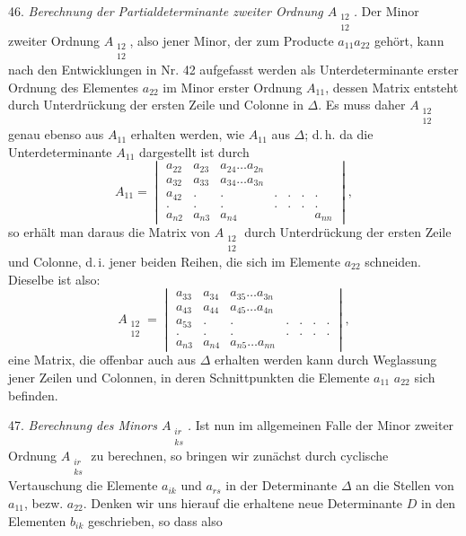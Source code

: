 \documentclass[11pt]{article}
\begin{document}
46. \textit{Berechnung der Partialdeterminante zweiter Ordnung $A_{\substack{12\\12}}$.} Der Minor zweiter Ordnung $A_{\substack{12\\12}}$, also jener Minor, der zum Producte $a_{11}a_{22}$ gehört, kann nach den Entwicklungen in Nr. 42 aufgefasst werden als Unterdeterminante erster Ordnung des Elementes $a_{22}$ im Minor erster Ordnung $A_{11}$, dessen Matrix entsteht durch Unterdrückung der ersten Zeile und Colonne in $\varDelta$. Es muss daher $A_{\substack{12\\12}}$ genau ebenso aus $A_{11}$ erhalten werden, wie $A_{11}$ aus $\varDelta$; d.\,h. da die Unterdeterminante $A_{11}$ dargestellt ist durch
\[
A_{11} = \begin{vmatrix} a_{22} & a_{23} & a_{24} \ldots a_{2n}\\ a_{32} & a_{33} & a_{34} \ldots a_{3n}\\ a_{42} & . & . & . & . & . & .\\ . & . & . & . & . & . & .\\ a_{n2} & a_{n3} & a_{n4} & & & & a_{nn} \end{vmatrix},
\]
so erhält man daraus die Matrix von $A_{\substack{12\\12}}$ durch Unterdrückung der ersten Zeile und Colonne, d.\,i. jener beiden Reihen, die sich im Elemente $a_{22}$ schneiden. Dieselbe ist also:
\[
A_{\substack{12\\12}} = \begin{vmatrix} a_{33} & a_{34} & a_{35} \ldots a_{3n}\\ a_{43} & a_{44} & a_{45} \ldots a_{4n}\\ a_{53} & . & . & . & . & . & .\\ . & . & . & . & . & . & .\\ a_{n3} & a_{n4} & a_{n5} \ldots a_{nn} \end{vmatrix},
\]
eine Matrix, die offenbar auch aus $\varDelta$ erhalten werden kann durch Weglassung jener Zeilen und Colonnen, in deren Schnittpunkten die Elemente $a_{11}$ $a_{22}$ sich befinden.

47. \textit{Berechnung des Minors $A_{\substack{ir\\ks}}$.} Ist nun im allgemeinen Falle der Minor zweiter Ordnung $A_{\substack{ir\\ks}}$ zu berechnen, so bringen wir zunächst durch cyclische Vertauschung die Elemente $a_{ik}$ und $a_{rs}$ in der Determinante $\varDelta$ an die Stellen von $a_{11}$, bezw. $a_{22}$. Denken wir uns hierauf die erhaltene neue Determinante $D$ in den Elementen $b_{ik}$ geschrieben, so dass also
\end{document}
